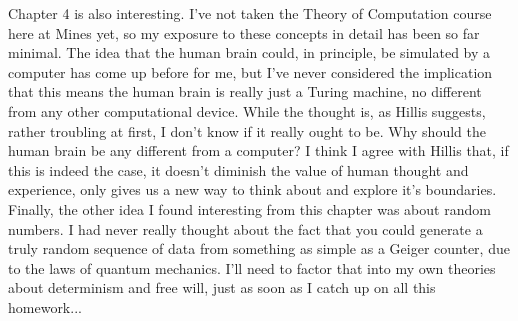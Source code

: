 \documentclass[12pt]{article}
\begin{document}
Chapter 4 is also interesting. I've not taken the Theory of Computation course
here at Mines yet, so my exposure to these concepts in detail has been so far
minimal. The idea that the human brain could, in principle, be simulated by a
computer has come up before for me, but I've never considered the implication
that this means the human brain is really just a Turing machine, no different
from any other computational device. While the thought is, as Hillis suggests,
rather troubling at first, I don't know if it really ought to be. Why should
the human brain be any different from a computer? I think I agree with Hillis
that, if this is indeed the case, it doesn't diminish the value of human
thought and experience, only gives us a new way to think about and explore it's
boundaries. Finally, the other idea I found interesting from this chapter was
about random numbers. I had never really thought about the fact that you could
generate a truly random sequence of data from something as simple as a Geiger
counter, due to the laws of quantum mechanics. I'll need to factor that into my
own theories about determinism and free will, just as soon as I catch up on all
this homework...
\end{document}
